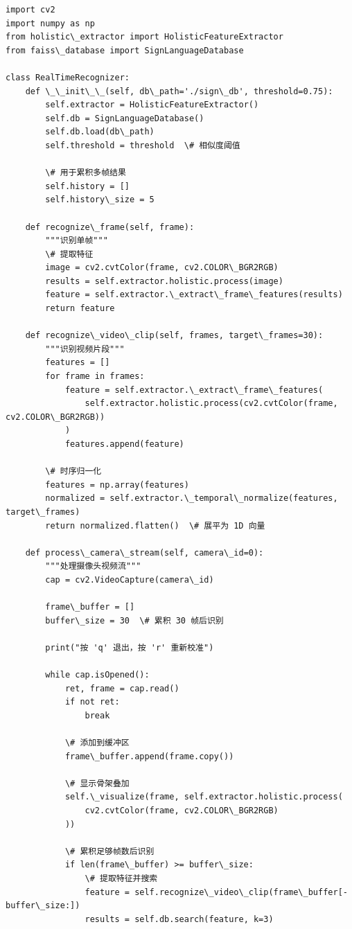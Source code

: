 \documentclass[a4paper,12pt]{article}
\begin{document}
\begin{verbatim}
import cv2
import numpy as np
from holistic\_extractor import HolisticFeatureExtractor
from faiss\_database import SignLanguageDatabase

class RealTimeRecognizer:
    def \_\_init\_\_(self, db\_path='./sign\_db', threshold=0.75):
        self.extractor = HolisticFeatureExtractor()
        self.db = SignLanguageDatabase()
        self.db.load(db\_path)
        self.threshold = threshold  \# 相似度阈值
        
        \# 用于累积多帧结果
        self.history = []
        self.history\_size = 5
    
    def recognize\_frame(self, frame):
        """识别单帧"""
        \# 提取特征
        image = cv2.cvtColor(frame, cv2.COLOR\_BGR2RGB)
        results = self.extractor.holistic.process(image)
        feature = self.extractor.\_extract\_frame\_features(results)
        return feature
    
    def recognize\_video\_clip(self, frames, target\_frames=30):
        """识别视频片段"""
        features = []
        for frame in frames:
            feature = self.extractor.\_extract\_frame\_features(
                self.extractor.holistic.process(cv2.cvtColor(frame, cv2.COLOR\_BGR2RGB))
            )
            features.append(feature)
        
        \# 时序归一化
        features = np.array(features)
        normalized = self.extractor.\_temporal\_normalize(features, target\_frames)
        return normalized.flatten()  \# 展平为 1D 向量
    
    def process\_camera\_stream(self, camera\_id=0):
        """处理摄像头视频流"""
        cap = cv2.VideoCapture(camera\_id)
        
        frame\_buffer = []
        buffer\_size = 30  \# 累积 30 帧后识别
        
        print("按 'q' 退出，按 'r' 重新校准")
        
        while cap.isOpened():
            ret, frame = cap.read()
            if not ret:
                break
            
            \# 添加到缓冲区
            frame\_buffer.append(frame.copy())
            
            \# 显示骨架叠加
            self.\_visualize(frame, self.extractor.holistic.process(
                cv2.cvtColor(frame, cv2.COLOR\_BGR2RGB)
            ))
            
            \# 累积足够帧数后识别
            if len(frame\_buffer) >= buffer\_size:
                \# 提取特征并搜索
                feature = self.recognize\_video\_clip(frame\_buffer[-buffer\_size:])
                results = self.db.search(feature, k=3)
                

\end{verbatim}
\end{document}
